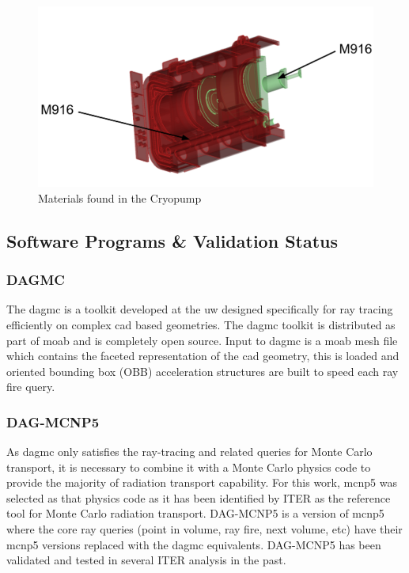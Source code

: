 \documentclass[12pt]{article}
\begin{document}
\begin{figure}[p]
  \centering
  \includegraphics[scale=0.32]{../plots/cad/mats/label_6.png}
  \caption{Materials found in the Cryopump}
  \label{fig:material_assign_5}
\end{figure}

\newpage
\clearpage
\subsection{Software Programs \& Validation Status}
\subsubsection{DAGMC}
The \gls{dagmc} is a toolkit developed at the \gls{uw}
designed specifically for ray tracing efficiently on complex \gls{cad} based
geometries. The \gls{dagmc} toolkit is distributed as part of \gls{moab} and
is completely open source. Input to \gls{dagmc} is a \gls{moab} mesh file
which contains the faceted representation of the \gls{cad} geometry, this
is loaded and oriented bounding box (OBB) acceleration structures are built
to speed each ray fire query.

\subsubsection{DAG-MCNP5}
As \gls{dagmc} only satisfies the ray-tracing 
and related queries for Monte Carlo transport, it is necessary to combine it
with a Monte Carlo physics code to provide the majority of radiation transport
capability. For this work, \gls{mcnp5} \cite{mcnp} was selected as that physics
code as it has been identified by ITER as the reference tool for Monte Carlo 
radiation transport.  DAG-MCNP5 \cite{dagmc} is a version of \gls{mcnp5} where the core ray
queries (point in volume, ray fire, next volume, etc) have their \gls{mcnp5}
versions replaced with the \gls{dagmc} equivalents. DAG-MCNP5 has been validated
\cite{dagmc_validation} and tested in several ITER analysis in the past.
\end{document}
